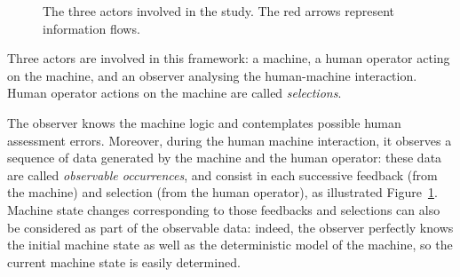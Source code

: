 \begin{figure}
\centering
{}
\caption[Relation between actors involved in the Human-Machine Interation study]{The three actors involved in the study. The red arrows represent information flows.}
 \label{Observer}
\end{figure}

Three actors are involved in this framework: a machine, 
a human operator acting on the machine, 
and an observer analysing the human-machine interaction.
Human operator actions on the machine are called \textit{selections}.

The observer knows the machine logic and contemplates possible human 
assessment errors. Moreover, during the human machine interaction, 
it observes a sequence of data generated by the machine and the human operator: 
these data are called \textit{observable occurrences}, and consist 
in each successive feedback (from the machine) and selection 
(from the human operator), as illustrated Figure~\ref{Observer}. 
Machine state changes corresponding to those feedbacks and 
selections can also be considered as part of the observable data: 
indeed, the observer perfectly knows the initial machine state as well 
as the deterministic model of the machine, so the current machine state 
is easily determined.

